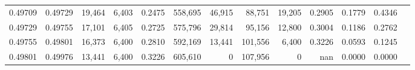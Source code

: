 \begin{tabular}{rrrrrrrrrrrrr}
0.49709 & 0.49729 & 19,464 & 6,403 &                                     0.2475 & 558,695 &  46,915 &  88,751 &  19,205 & 0.2905 & 0.1779 & 0.4346 \\
0.49729 & 0.49755 & 17,101 & 6,405 &                                     0.2725 & 575,796 &  29,814 &  95,156 &  12,800 & 0.3004 & 0.1186 & 0.2762 \\
0.49755 & 0.49801 & 16,373 & 6,400 &                                     0.2810 & 592,169 &  13,441 & 101,556 &   6,400 & 0.3226 & 0.0593 & 0.1245 \\
0.49801 & 0.49976 & 13,441 & 6,400 &                                     0.3226 & 605,610 &       0 & 107,956 &       0 &    nan & 0.0000 & 0.0000 \\
\bottomrule
\end{tabular}

